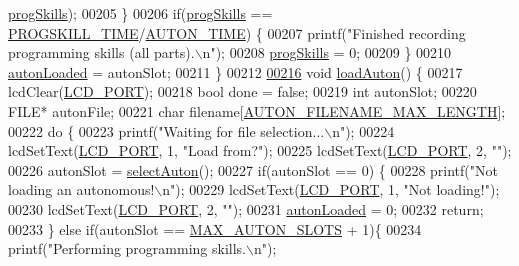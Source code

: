 \begin{DoxyCode}
{{{{{{{{{{{{{{{{{{{{{{{{      \hyperlink{autonrecorder_8c_aa2eda471576bdbaf33835a71da9bc616}{progSkills});
00205     \}
00206     \textcolor{keywordflow}{if}(\hyperlink{autonrecorder_8c_aa2eda471576bdbaf33835a71da9bc616}{progSkills} == \hyperlink{autonrecorder_8h_a5e27ac66dea6c2da6239f967e72208e2}{PROGSKILL\_TIME}/\hyperlink{autonrecorder_8h_aa19f7c427989a0a67f55958c610d0355}{AUTON\_TIME}) \{
00207         printf(\textcolor{stringliteral}{"Finished recording programming skills (all parts).\(\backslash\)n"});
00208         \hyperlink{autonrecorder_8c_aa2eda471576bdbaf33835a71da9bc616}{progSkills} = 0;
00209     \}
00210     \hyperlink{autonrecorder_8c_a4e72d907ee74449b71b5e20943f4217e}{autonLoaded} = autonSlot;
00211 \}
00212 
\hypertarget{autonrecorder_8c_source.tex_l00216}{}\hyperlink{autonrecorder_8h_af6d130061f44459f9b3c629123e78f6e}{00216} \textcolor{keywordtype}{void} \hyperlink{autonrecorder_8c_af6d130061f44459f9b3c629123e78f6e}{loadAuton}() \{
00217     lcdClear(\hyperlink{lcdmsg_8h_abcf42bd88b3c36193f301ca25b033875}{LCD\_PORT});
00218     \textcolor{keywordtype}{bool} done = \textcolor{keyword}{false};
00219     \textcolor{keywordtype}{int} autonSlot;
00220     FILE* autonFile;
00221     \textcolor{keywordtype}{char} filename[\hyperlink{autonrecorder_8h_a9411d1482daa18dd8221c30db7fc6e4e}{AUTON\_FILENAME\_MAX\_LENGTH}];
00222     \textcolor{keywordflow}{do} \{
00223         printf(\textcolor{stringliteral}{"Waiting for file selection...\(\backslash\)n"});
00224         lcdSetText(\hyperlink{lcdmsg_8h_abcf42bd88b3c36193f301ca25b033875}{LCD\_PORT}, 1, \textcolor{stringliteral}{"Load from?"});
00225         lcdSetText(\hyperlink{lcdmsg_8h_abcf42bd88b3c36193f301ca25b033875}{LCD\_PORT}, 2, \textcolor{stringliteral}{""});
00226         autonSlot = \hyperlink{autonrecorder_8c_a7233586e332461dc25c7cc950a08d429}{selectAuton}();
00227         \textcolor{keywordflow}{if}(autonSlot == 0) \{
00228             printf(\textcolor{stringliteral}{"Not loading an autonomous!\(\backslash\)n"});
00229             lcdSetText(\hyperlink{lcdmsg_8h_abcf42bd88b3c36193f301ca25b033875}{LCD\_PORT}, 1, \textcolor{stringliteral}{"Not loading!"});
00230             lcdSetText(\hyperlink{lcdmsg_8h_abcf42bd88b3c36193f301ca25b033875}{LCD\_PORT},   2, \textcolor{stringliteral}{""});
00231             \hyperlink{autonrecorder_8c_a4e72d907ee74449b71b5e20943f4217e}{autonLoaded} = 0;
00232             \textcolor{keywordflow}{return};
00233         \} \textcolor{keywordflow}{else} \textcolor{keywordflow}{if}(autonSlot == \hyperlink{autonrecorder_8h_a5173a11a545cb4020fdd139552dc15c1}{MAX\_AUTON\_SLOTS} + 1)\{
00234             printf(\textcolor{stringliteral}{"Performing programming skills.\(\backslash\)n"});
}}}}}}}}}}}}}}}}}}}}}}}}
\end{DoxyCode}
